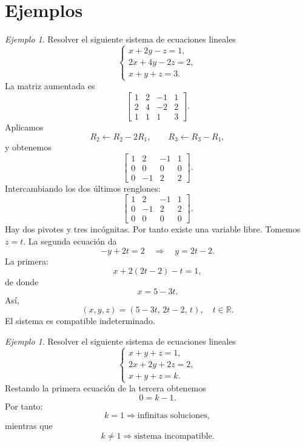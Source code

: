\documentclass[12pt]{article}
\theoremstyle{remark}
\newtheorem{Ejem}[definicion]{Ejemplo}
\newcommand{\R}{\mathbb{R}}
\begin{document}
\section{Ejemplos}
\begin{Ejem} Resolver el siguiente sistema de ecuaciones lineales
\[
\begin{cases}
x+2y-z=1,\\
2x+4y-2z=2,\\
x+y+z=3.
\end{cases}
\]
La matriz aumentada es
\[
\left[
\begin{array}{ccc|c}
1&2&-1&1\\
2&4&-2&2\\
1&1&1&3
\end{array}
\right].
\]
Aplicamos
\[
R_2\leftarrow R_2-2R_1,\qquad
R_3\leftarrow R_3-R_1,
\]
y obtenemos
\[
\left[
\begin{array}{ccc|c}
1&2&-1&1\\
0&0&0&0\\
0&-1&2&2
\end{array}
\right].
\]
Intercambiando los dos últimos renglones:
\[
\left[
\begin{array}{ccc|c}
1&2&-1&1\\
0&-1&2&2\\
0&0&0&0
\end{array}
\right].
\]
Hay dos pivotes y tres incógnitas. Por tanto existe una variable libre. Tomemos $z=t$. La segunda
ecuación da
\[
-y+2t=2\quad\Longrightarrow\quad y=2t-2.
\]
La primera:
\[
x+2(2t-2)-t=1,
\]
de donde
\[
x=5-3t.
\]
Así,
\[
\boxed{(x,y,z)=(5-3t,\,2t-2,\,t),\quad t\in\R.}
\]
El sistema es compatible indeterminado.
\end{Ejem}
\begin{Ejem} Resolver el siguiente sistema de ecuaciones lineales
\[
\begin{cases}
x+y+z=1,\\
2x+2y+2z=2,\\
x+y+z=k.
\end{cases}
\]
Restando la primera ecuación de la tercera obtenemos
\[
0=k-1.
\]
Por tanto:
\[
k=1\Longrightarrow\text{infinitas soluciones},
\]
mientras que
\[
k\neq1\Longrightarrow\text{sistema incompatible}.
\]
\end{Ejem}
\end{document}
